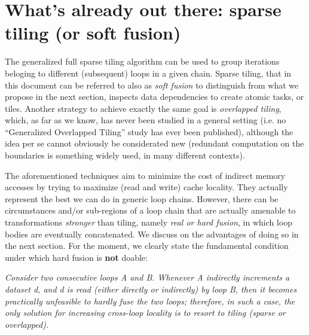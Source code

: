 \documentclass[a4paper]{article}
\begin{document}
\section{What's already out there: sparse tiling (or soft fusion)}
The generalized full sparse tiling algorithm can be used to group iterations beloging to different (subsequent) loops in a given chain. Sparse tiling, that in this document can be referred to also as \textit{soft fusion} to distinguish from what we propose in the next section, inspects data dependencies to create atomic tasks, or tiles. Another strategy to achieve exactly the same goal is \textit{overlapped tiling}, which, as far as we know, has never been studied in a general setting (i.e. no ``Generalized Overlapped Tiling'' study has ever been published), although the idea per se cannot obviously be considerated new (redundant computation on the boundaries is something widely used, in many different contexts). 

The aforementioned techniques aim to minimize the cost of indirect memory accesses by trying to maximize (read and write) cache locality. They actually represent the best we can do in generic loop chains. However, there can be circumstances and/or sub-regions of a loop chain that are actually amenable to transformations \textit{stronger} than tiling, namely \textit{real or hard fusion}, in which loop bodies are eventually concatenated. We discuss on the advantages of doing so in the next section. For the moment, we clearly state the fundamental condition under which hard fusion is \textbf{not} doable:
\begin{center}
\textit{Consider two consecutive loops \emph{A} and \emph{B}. Whenever \emph{A} indirectly increments a dataset \emph{d}, and \emph{d} is read (either directly or indirectly) by loop \emph{B}, then it becomes practically unfeasible to hardly fuse the two loops; therefore, in such a case, the only solution for increasing cross-loop locality is to resort to tiling (sparse or overlapped).}
\end{center}


\end{document}
